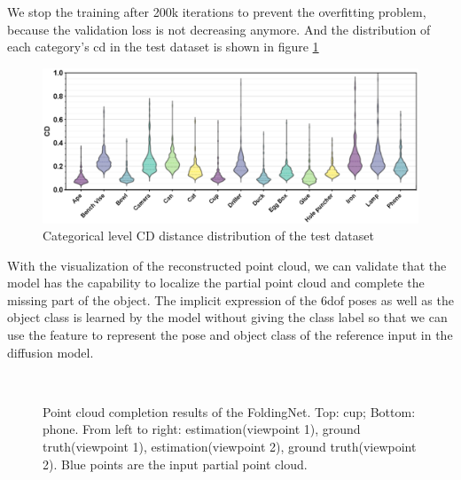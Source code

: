 \documentclass[12pt,DIV14,BCOR12mm,a4paper,footinclude=false,headinclude,parskip=half-,twoside,openright,cleardoublepage=empty,toc=index,bibliography=totoc,listof=totoc]{scrreprt}
\numberwithin{equation}{chapter}
\begin{document}
We stop the training after 200k iterations to prevent the overfitting problem, because the validation loss is not decreasing anymore. And the distribution of each category's \gls{cd} in the test dataset is shown in figure \ref{img:cd_cate} 

\begin{figure}[h]
	\centering
	\includegraphics[width=1.\textwidth]{img/cd_category.eps}
	\caption{Categorical level CD distance distribution of the test dataset}
	\label{img:cd_cate}
\end{figure}



With the visualization of the reconstructed point cloud, we can validate that the model has the capability to localize the partial point cloud and complete the missing part of the object. The implicit expression of the \gls{6dof} poses as well as the object class is learned by the model without giving the class label so that we can use the feature to represent the pose and object class of the reference input in the diffusion model.

\begin{figure}[h]
	\centering
	\\
  \centering
	\caption{Point cloud completion results of the FoldingNet. Top: cup; Bottom: phone. From left to right: estimation(viewpoint 1), ground truth(viewpoint 1), estimation(viewpoint 2), ground truth(viewpoint 2). Blue points are the input partial point cloud.}
	\label{img:comp_all}
\end{figure}
\end{document}
